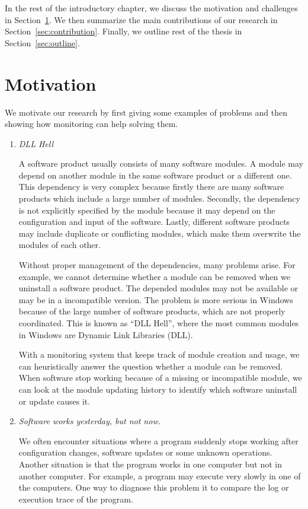 In the rest of the introductory chapter,
we discuss the motivation and challenges in Section~\ref{sec:motivation}.
We then summarize the main contributions of our research in
Section~\ref{sec:contribution}.
Finally, we outline rest of the thesis in Section~\ref{sec:outline}.

\section{Motivation}
\label{sec:motivation}

We motivate our research by first giving some examples of problems and
then showing how monitoring can help solving them.

\begin{enumerate}
\item {\em DLL Hell}

A software product usually consists of many software modules.
A module may depend on another module in the same software product or
a different one.
This dependency is very complex because firstly there are many
software products which include a large number of modules.
Secondly, the dependency is not explicitly specified by the module
because it may depend on the configuration and input of the software.
Lastly, different software products may include duplicate or conflicting
modules, which make them overwrite the modules of each other.

Without proper management of the dependencies, many problems arise.
For example, we cannot determine whether a module can be removed
when we uninstall a software product.
The depended modules may not be available or may be in
a incompatible version.
The problem is more serious in Windows because of the large
number of software products, which are not properly coordinated.
This is known as ``DLL Hell'', where the most common modules
in Windows are Dynamic Link Libraries (DLL).

With a monitoring system that keeps track of module creation and usage,
we can heuristically answer the question whether a module can be removed.
When software stop working because of a missing or incompatible module,
we can look at the module updating history to identify which software
uninstall or update causes it.

\item {\em Software works yesterday, but not now.}

We often encounter situations where a program suddenly stops working after
configuration changes, software updates or some unknown operations.
Another situation is that the program works in one computer but not in
another computer.
For example, a program may execute very slowly in one of the computers.
One way to diagnose this problem it to compare the log or execution trace
of the program.


\end{enumerate}
